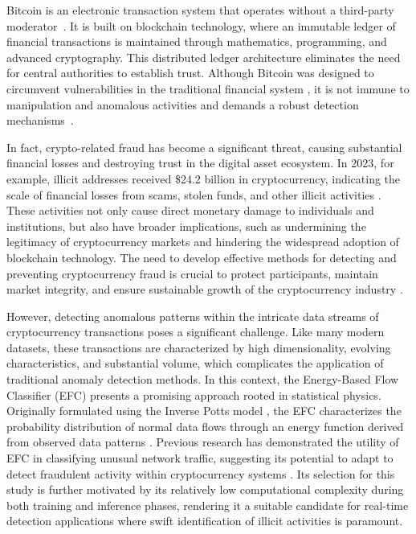 Bitcoin is an electronic transaction system that operates without a third-party moderator~\cite{nakamoto2008bitcoin}. It is
built on blockchain technology, where an immutable ledger of financial transactions is maintained through mathematics,
programming, and advanced cryptography. This distributed ledger architecture eliminates the need for central authorities
to establish trust. Although Bitcoin was designed to circumvent vulnerabilities in the traditional financial system
\cite{nakamoto2008bitcoin}, it is not immune to manipulation and anomalous activities and demands a robust detection
mechanisms~\cite{fang2022cryptocurrency, zhang2020financial,zainal2018review}. 

In fact, crypto-related fraud has become a significant threat, causing substantial financial losses and destroying
trust in the digital asset ecosystem. In 2023, for example, illicit addresses received \$24.2 billion in cryptocurrency,
indicating the scale of financial losses from scams, stolen funds, and other illicit activities \cite{chainalysis2024cryptocrime}.
These activities not only cause direct monetary damage to individuals and institutions, but also have broader implications,
such as undermining the legitimacy of cryptocurrency markets and hindering the widespread adoption of blockchain technology.
The need to develop effective methods for detecting and preventing cryptocurrency fraud is crucial to protect participants,
maintain market integrity, and ensure sustainable growth of the cryptocurrency industry \cite{scharfman2024, Khiari2025}.

However, detecting anomalous patterns within the intricate data streams of cryptocurrency transactions poses a significant
challenge. Like many modern datasets, these transactions are characterized by high dimensionality, evolving characteristics,
and substantial volume, which complicates the application of traditional anomaly detection methods. In this context, the
Energy-Based Flow Classifier (EFC) presents a promising approach rooted in statistical physics. Originally formulated using
the Inverse Potts model \cite{pontes2019}, the EFC characterizes the probability distribution of normal data flows through
an energy function derived from observed data patterns \cite{pontes2019}. Previous research has demonstrated the utility
of EFC in classifying unusual network traffic, suggesting its potential to adapt to detect fraudulent activity within cryptocurrency
systems \cite{pontes2019, souza2022novelopensetenergybased}. Its selection for this study is further motivated by its relatively
low computational complexity during both training and inference phases, rendering it a suitable candidate for real-time detection
applications where swift identification of illicit activities is paramount.

